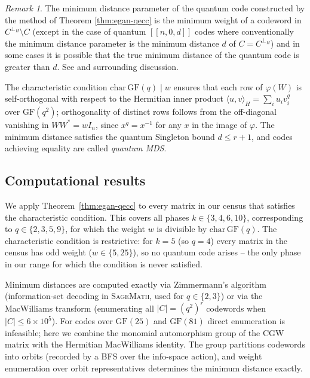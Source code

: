 \documentclass{article}
\theoremstyle{definition}
\theoremstyle{remark}
\newtheorem{remark}[theorem]{Remark}
\newcommand{\GF}{\mathrm{GF}}
\begin{document}
\begin{remark}
The minimum distance parameter of the quantum code constructed by the method of Theorem \ref{thm:egan-qecc} is the minimum weight of a codeword in $C^{\perp_{H}} \setminus C$ (except in the case of quantum $[[n,0,d]]$ codes where conventionally the minimum distance parameter is the minimum distance $d$ of $C = C^{\perp_{H}}$) and in some cases it is possible that the true minimum distance of the quantum code is greater than $d$. See \cite[Corollary 19]{Ketkar} and surrounding discussion.  
\end{remark}

The characteristic condition $\mathrm{char}\,\GF(q) \mid w$ ensures that each row of
$\varphi(W)$ is self-orthogonal with respect to the Hermitian inner product
$\langle u, v \rangle_H = \sum_i u_i v_i^q$ over $\GF(q^2)$; orthogonality of distinct rows
follows from the off-diagonal vanishing in $WW^* = wI_n$, since $x^{q} = x^{-1}$ for any $x$ in the image of $\varphi$. The minimum distance satisfies the quantum Singleton bound $d \leq r+1$,
and codes achieving equality are called \emph{quantum MDS}.

\subsection{Computational results}

We apply Theorem~\ref{thm:egan-qecc} to every matrix in our census that satisfies the
characteristic condition. This covers all phases $k \in \{3,4,6,10\}$, corresponding to
$q \in \{2,3,5,9\}$, for which the weight $w$ is divisible by
$\mathrm{char}\,\GF(q)$.  The characteristic condition is restrictive:
for $k = 5$ (so $q = 4$) every matrix in the census has odd weight
($w \in \{5, 25\}$), so no quantum code arises -- the only phase in our
range for which the condition is never satisfied.

Minimum distances are computed exactly via Zimmermann's algorithm (information-set decoding in
\textsc{SageMath}, used for $q \in \{2,3\}$) or via the MacWilliams transform (enumerating all
$|C|=(q^2)^r$ codewords when $|C|\leq 6\times 10^5$). For codes over $\GF(25)$ and $\GF(81)$
direct enumeration is infeasible; here we combine the monomial automorphism group of the CGW
matrix with the Hermitian MacWilliams identity. The group partitions codewords into orbits
(recorded by a BFS over the info-space action), and weight enumeration over orbit representatives
determines the minimum distance exactly.
\end{document}
